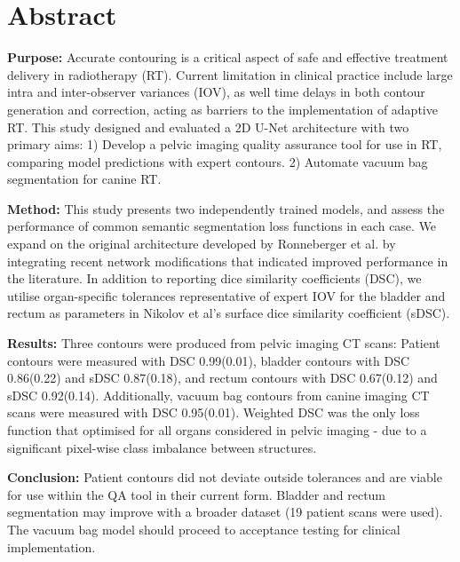 \chapter{Abstract} \label{ch:abstract}

\textbf{Purpose:} Accurate contouring is a critical aspect of safe and effective
treatment delivery in radiotherapy (RT). Current limitation in clinical practice
include large intra and inter-observer variances (IOV), as well time delays in
both contour generation and correction, acting as barriers to the implementation
of adaptive RT. This study designed and evaluated a 2D U-Net architecture with
two primary aims: 1) Develop a pelvic imaging quality assurance tool for use in
RT, comparing model predictions with expert contours. 2) Automate vacuum bag
segmentation for canine RT.

\textbf{Method:} This study presents two independently trained models, and
assess the performance of common semantic segmentation loss functions in each
case. We expand on the original architecture developed by Ronneberger et al. by
integrating recent network modifications that indicated improved performance in
the literature. In addition to reporting dice similarity coefficients (DSC), we
utilise organ-specific tolerances representative of expert IOV for the bladder
and rectum as parameters in Nikolov et al's surface dice similarity coefficient
(sDSC).

\textbf{Results:} Three contours were produced from pelvic imaging CT scans:
Patient contours were measured with DSC 0.99(0.01), bladder contours with
DSC 0.86(0.22) and sDSC 0.87(0.18), and rectum contours with DSC 0.67(0.12)
and sDSC 0.92(0.14).  Additionally, vacuum bag contours from canine imaging CT
scans were measured with DSC 0.95(0.01). Weighted DSC was the only loss function
that optimised for all organs considered in pelvic imaging - due to a
significant pixel-wise class imbalance between structures.

\textbf{Conclusion:} Patient contours did not deviate outside tolerances and are
viable for use within the QA tool in their current form.  Bladder and rectum
segmentation may improve with a broader dataset (19 patient scans were used).
The vacuum bag model should proceed to acceptance testing for clinical
implementation.
